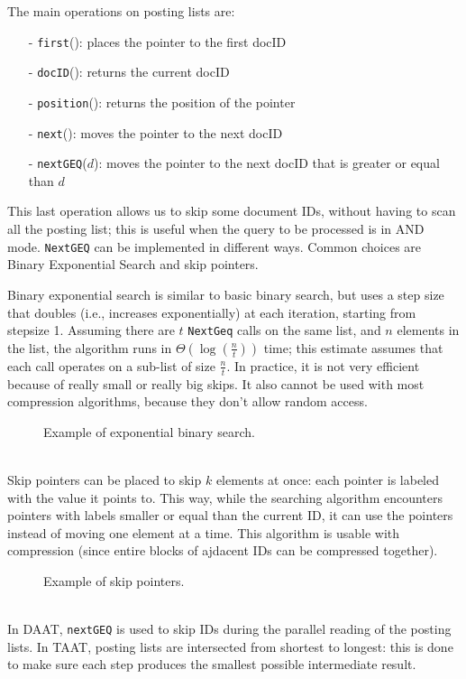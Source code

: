 The main operations on posting lists are:
\begin{itemize}[itemsep=0pt]
    \item[-] \texttt{first}(): places the pointer to the first docID
    \item[-] \texttt{docID}(): returns the current docID
    \item[-] \texttt{position}(): returns the position of the pointer
    \item[-] \texttt{next}(): moves the pointer to the next docID
    \item[-] \texttt{nextGEQ}($d$): moves the pointer to the next docID that is greater or equal than $d$
\end{itemize}
This last operation allows us to skip some document IDs, without having to scan all the posting list; this is useful when the query to be processed is in AND mode. \texttt{NextGEQ} can be implemented in different ways. Common choices are Binary Exponential Search and skip pointers.

Binary exponential search is similar to basic binary search, but uses a step size that doubles (i.e., increases exponentially) at each iteration, starting from stepsize 1. Assuming there are $t$ \texttt{NextGeq} calls on the same list, and $n$ elements in the list, the algorithm runs in $\Theta (\log(\frac{n}{t}))$ time; this estimate assumes that each call operates on a sub-list of size $\frac{n}{t}$. In practice, it is not very efficient because of really small or really big skips. It also cannot be used with most compression algorithms, because they don't allow random access.
\begin{figure}[!ht]
    \centering
    
    \caption{Example of exponential binary search.}
    \label{fig:binary-search}
\end{figure} \\
Skip pointers can be placed to skip $k$ elements at once: each pointer is labeled with the value it points to. This way, while the searching algorithm encounters pointers with labels smaller or equal than the current ID, it can use the pointers instead of moving one element at a time. This algorithm is usable with compression (since entire blocks of ajdacent IDs can be compressed together).
\begin{figure}[!ht]
    \centering
    
    \caption{Example of skip pointers.}
    \label{fig:skip-pointers}
\end{figure} \\
In DAAT, \texttt{nextGEQ} is used to skip IDs during the parallel reading of the posting lists. In TAAT, posting lists are intersected from shortest to longest: this is done to make sure each step produces the smallest possible intermediate result.

